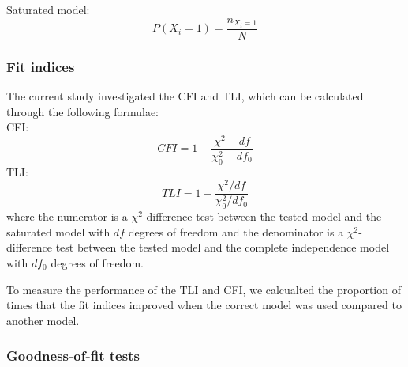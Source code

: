 \documentclass[Royal,sageapa,times, doublespace]{sagej}
\begin{document}
Saturated model:
\begin{equation}
P(X_i = 1) = \frac{n_{X_i = 1}}{N}
\end{equation}
\subsubsection{Fit indices} 
The current study investigated the CFI and TLI, which can be calculated through the following formulae: \\

CFI:
\begin{equation}
CFI = 1 - \frac{\chi^{2} - df}{\chi^{2}_{0} - df_0}
\end{equation}
TLI:
\begin{equation}
TLI = 1 - \frac{\chi^{2}/df}{\chi^{2}_{0}/df_0}
\end{equation}
where the numerator is a $\chi^2$-difference test between the tested model and the saturated model with $df$ degrees of freedom 
and the denominator is a $\chi^2$-difference test between the tested model and the complete independence model with $df_0$ degrees of freedom.

To measure the performance of the TLI and CFI, we calcualted the proportion of times that the fit indices improved when the correct model was used compared to another model.

\subsubsection{Goodness-of-fit tests}
\end{document}
